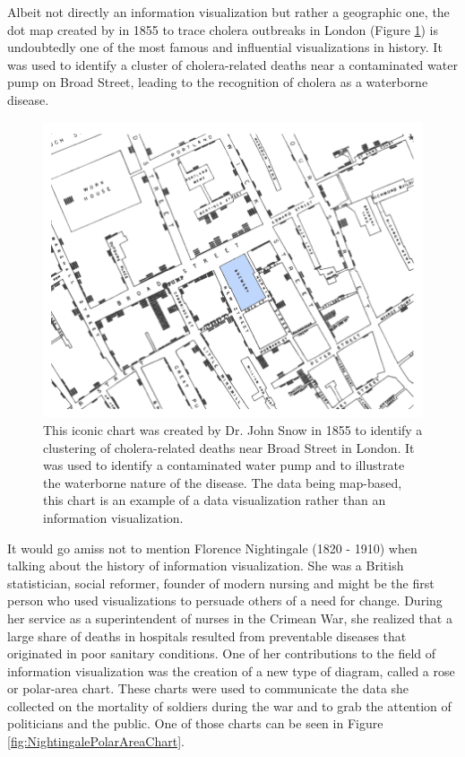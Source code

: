 Albeit not directly an information visualization but rather a geographic one, the dot map created by \cite{ModeOfCommunicationOfCholera} in 1855 to trace cholera outbreaks in London (Figure \ref{fig:CholeraDotMap}) is undoubtedly one of the most famous and influential visualizations in history. It was used to identify a cluster of cholera-related deaths near a contaminated water pump on Broad Street, leading to the recognition of cholera as a waterborne disease.

\begin{figure}[tp]
    \centering
    \includegraphics[keepaspectratio,width=\linewidth,height=\fullh / 3]
    {images/cholera-dot-map.png}
    \caption[Dot Map Plotting Cholera Deaths in London From 1855]{
        This iconic chart was created by Dr. John Snow in 1855 to identify a clustering of cholera-related deaths near Broad Street in London. It was used to identify a contaminated water pump and to illustrate the waterborne nature of the disease. The data being map-based, this chart is an example of a data visualization rather than an information visualization. 
    }
    \label{fig:CholeraDotMap}
\end{figure}

It would go amiss not to mention Florence Nightingale (1820 - 1910) when talking about the history of information visualization. She was a British statistician, social reformer, founder of modern nursing and might be the first person who used visualizations to persuade others of a need for change. During her service as a superintendent of nurses in the Crimean War, she realized that a large share of deaths in hospitals resulted from preventable diseases that originated in poor sanitary conditions. One of her contributions to the field of information visualization was the creation of a new type of diagram, called a rose or polar-area chart. These charts were used to communicate the data she collected on the mortality of soldiers during the war and to grab the attention of politicians and the public. One of those charts can be seen in Figure \ref{fig:NightingalePolarAreaChart}. 

